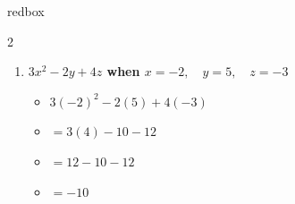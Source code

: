 \documentclass[10pt]{article}
\begin{document}
    \renewcommand{\arraystretch}{1.6}
    \begin{skillbox}{redbox}
        \begin{multicols}{2}
            \raggedcolumns
            \begin{enumerate}
                \item \textbf{$3x^2 - 2y + 4z$ when $x=-2,\quad y=5,\quad z=-3$}
                \begin{itemize}
                    \item $3(-2)^2-2(5)+4(-3)$
                    \item $=3(4)-10-12$
                    \item $=12-10-12$
                    \item $=-10$
                \end{itemize}


\end{enumerate}
\end{multicols}
\end{skillbox}
\end{document}
